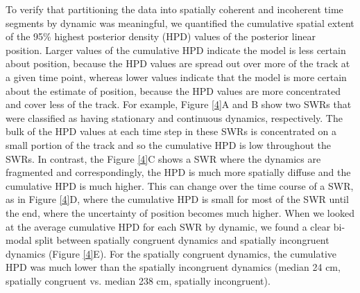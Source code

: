 \documentclass[times, twoside]{zHenriquesLab-StyleBioRxiv}
\begin{document}
To verify that partitioning the data into spatially coherent and incoherent time segments by dynamic was meaningful, we quantified the cumulative spatial extent of the 95\% highest posterior density (HPD) values of the posterior linear position. Larger values of the cumulative HPD indicate the model is less certain about position, because the HPD values are spread out over more of the track at a given time point, whereas lower values indicate that the model is more certain about the estimate of position, because the HPD values are more concentrated and cover less of the track. For example, Figure \ref{4}A and B show two SWRs that were classified as having stationary and continuous dynamics, respectively. The bulk of the HPD values at each time step in these SWRs is concentrated on a small portion of the track and so the cumulative HPD is low throughout the SWRs. In contrast, the Figure \ref{4}C shows a SWR where the dynamics are fragmented and correspondingly, the HPD is much more spatially diffuse and the cumulative HPD is much higher. This can change over the time course of a SWR, as in Figure \ref{4}D, where the cumulative HPD is small for most of the SWR until the end, where the uncertainty of position becomes much higher. When we looked at the average cumulative HPD for each SWR by dynamic, we found a clear bi-modal split between spatially congruent dynamics and spatially incongruent dynamics (Figure \ref{4}E). For the spatially congruent dynamics, the cumulative HPD was much lower than the spatially incongruent dynamics (median 24 cm, spatially congruent vs. median 238 cm, spatially incongruent).
\end{document}
